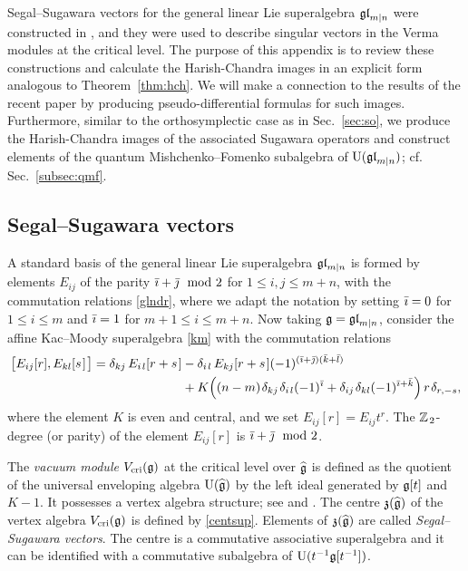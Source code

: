 \documentclass[12pt]{article}
\begin{document}
Segal--Sugawara vectors for the general linear Lie superalgebra $\mathfrak{gl}_{m|n}$ were constructed
in \cite{mr:mm}, and they were used to describe singular vectors in the Verma
modules at the critical level. The purpose of this appendix is to review these
constructions and calculate the Harish-Chandra images in an explicit form
analogous to Theorem~\ref{thm:hch}.
We will make a connection to the results of the recent paper \cite{afn:ca}
by producing pseudo-differential formulas for such images.
Furthermore, similar
to the orthosymplectic case as in Sec.~\ref{sec:so}, we produce the Harish-Chandra images
of the associated Sugawara operators and construct elements of the quantum Mishchenko--Fomenko
subalgebra of ${\rm U}(\mathfrak{gl}_{m|n})$; cf. Sec.~\ref{subsec:qmf}.


\subsection{Segal--Sugawara vectors}
\label{subsec:ssvgln}


A standard basis of the general linear Lie superalgebra $\mathfrak{gl}_{m|n}$ is formed by elements $E_{ij}$
of the parity $\bar{\imath}+\bar{\jmath}\mod 2$ for $1\leqslant i,j\leqslant m+n$, with the commutation relations
\eqref{glndr}, where we adapt the notation by setting $\bar{\imath}=0$ for $1\leqslant i\leqslant m$ and
$\bar{\imath}=1$ for $m+1\leqslant i\leqslant m+n$.
Now taking $\mathfrak{g}=\mathfrak{gl}_{m|n}$, consider the
affine Kac--Moody superalgebra \eqref{km}
with the commutation relations
\begin{align}
\nonumber
\big[E_{ij}[r],E_{kl}[s\hspace{1pt}]\hspace{1pt}\big]
=\delta_{kj}\, E_{i\hspace{1pt} l}[r+s\hspace{1pt}]
{}&-\delta_{i\hspace{1pt} l}\, E_{kj}[r+s\hspace{1pt}](-1)^{(\bar{\imath}+\bar{\jmath})(\bar{k}+\bar{l})}\\
\label{commrel}
{}&+K\Big((n-m)\hspace{1pt}\delta_{kj}\hspace{1pt}\delta_{i\hspace{1pt} l}(-1)^{\bar{\imath}}
+\delta_{ij}\hspace{1pt}\delta_{kl}(-1)^{\bar{\imath}+\bar{k}}\Big)
\, r\hspace{1pt}\delta_{r,-s},
\end{align}
where the element $K$ is even and central, and
we set $E_{ij}[r]=E_{ij}t^r$. The $\mathbb{Z}\hspace{1pt}_2$-degree (or parity) of the element $E_{ij}[r]$
is $\bar{\imath}+\bar{\jmath}\mod 2$.

The {\em vacuum module}
$V_{{\rm cri}}(\mathfrak{g})$ at the critical level over $\widehat{\mathfrak{g}}$ is defined as the quotient
of the universal enveloping algebra
${\rm U}(\widehat{\mathfrak{g}})$ by the left ideal generated by
$\mathfrak{g}[t]$ and $K-1$. It possesses a vertex algebra
structure; see \cite{f:lc} and \cite{k:va}.
The centre $\mathfrak{z}(\widehat{\mathfrak{g}})$ of the vertex algebra $V_{{\rm cri}}(\mathfrak{g})$
is defined by \eqref{centsup}.
Elements of $\mathfrak{z}(\widehat{\mathfrak{g}})$
are called {\em Segal--Sugawara vectors\/}.
The centre
is a commutative associative superalgebra and it can be
identified with
a commutative subalgebra of ${\rm U}(t^{-1}\mathfrak{g}[t^{-1}])$.
\end{document}
